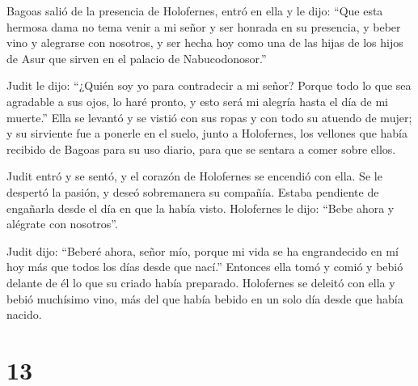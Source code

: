  Bagoas salió de la presencia de Holofernes, entró en
ella y le dijo: ``Que esta hermosa dama no tema venir a mi señor y ser
honrada en su presencia, y beber vino y alegrarse con nosotros, y ser
hecha hoy como una de las hijas de los hijos de Asur que sirven en el
palacio de Nabucodonosor.''

 Judit le dijo: ``¿Quién soy yo para contradecir a mi
señor? Porque todo lo que sea agradable a sus ojos, lo haré pronto, y
esto será mi alegría hasta el día de mi muerte.''  Ella
se levantó y se vistió con sus ropas y con todo su atuendo de mujer; y
su sirviente fue a ponerle en el suelo, junto a Holofernes, los vellones
que había recibido de Bagoas para su uso diario, para que se sentara a
comer sobre ellos.

 Judit entró y se sentó, y el corazón de Holofernes se
encendió con ella. Se le despertó la pasión, y deseó sobremanera su
compañía. Estaba pendiente de engañarla desde el día en que la había
visto.  Holofernes le dijo: ``Bebe ahora y alégrate con
nosotros''.

 Judit dijo: ``Beberé ahora, señor mío, porque mi vida se
ha engrandecido en mí hoy más que todos los días desde que nací.''
 Entonces ella tomó y comió y bebió delante de él lo que
su criado había preparado.  Holofernes se deleitó con
ella y bebió muchísimo vino, más del que había bebido en un solo día
desde que había nacido.

\hypertarget{section-12}{%
\section{13}\label{section-12}}

